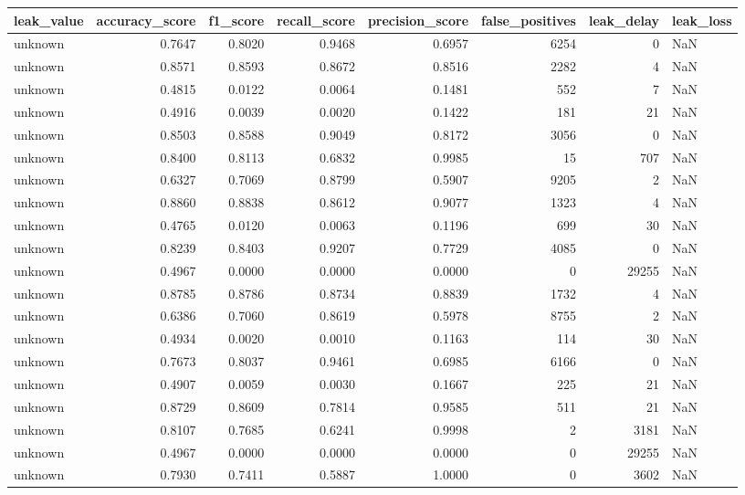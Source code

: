 \begin{tabular}{lrrrrrrl}
\toprule
leak\_value & accuracy\_score & f1\_score & recall\_score & precision\_score & false\_positives & leak\_delay & leak\_loss \\
\midrule
unknown & 0.7647 & 0.8020 & 0.9468 & 0.6957 & 6254 & 0 & NaN \\
unknown & 0.8571 & 0.8593 & 0.8672 & 0.8516 & 2282 & 4 & NaN \\
unknown & 0.4815 & 0.0122 & 0.0064 & 0.1481 & 552 & 7 & NaN \\
unknown & 0.4916 & 0.0039 & 0.0020 & 0.1422 & 181 & 21 & NaN \\
unknown & 0.8503 & 0.8588 & 0.9049 & 0.8172 & 3056 & 0 & NaN \\
unknown & 0.8400 & 0.8113 & 0.6832 & 0.9985 & 15 & 707 & NaN \\
unknown & 0.6327 & 0.7069 & 0.8799 & 0.5907 & 9205 & 2 & NaN \\
unknown & 0.8860 & 0.8838 & 0.8612 & 0.9077 & 1323 & 4 & NaN \\
unknown & 0.4765 & 0.0120 & 0.0063 & 0.1196 & 699 & 30 & NaN \\
unknown & 0.8239 & 0.8403 & 0.9207 & 0.7729 & 4085 & 0 & NaN \\
unknown & 0.4967 & 0.0000 & 0.0000 & 0.0000 & 0 & 29255 & NaN \\
unknown & 0.8785 & 0.8786 & 0.8734 & 0.8839 & 1732 & 4 & NaN \\
unknown & 0.6386 & 0.7060 & 0.8619 & 0.5978 & 8755 & 2 & NaN \\
unknown & 0.4934 & 0.0020 & 0.0010 & 0.1163 & 114 & 30 & NaN \\
unknown & 0.7673 & 0.8037 & 0.9461 & 0.6985 & 6166 & 0 & NaN \\
unknown & 0.4907 & 0.0059 & 0.0030 & 0.1667 & 225 & 21 & NaN \\
unknown & 0.8729 & 0.8609 & 0.7814 & 0.9585 & 511 & 21 & NaN \\
unknown & 0.8107 & 0.7685 & 0.6241 & 0.9998 & 2 & 3181 & NaN \\
unknown & 0.4967 & 0.0000 & 0.0000 & 0.0000 & 0 & 29255 & NaN \\
unknown & 0.7930 & 0.7411 & 0.5887 & 1.0000 & 0 & 3602 & NaN \\
\bottomrule
\end{tabular}
